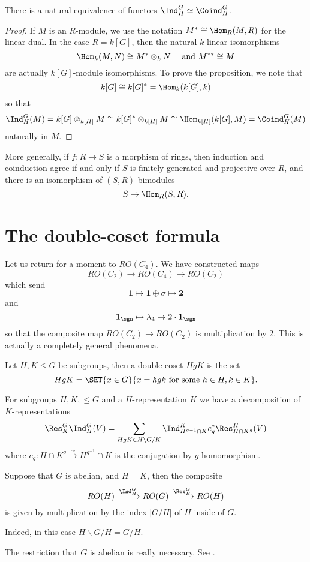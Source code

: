 \documentclass{willowtreebook}
\begin{document}
    \begin{proposition}
        There is a natural equivalence of functors $\Ind_H^G \simeq \Coind_H^G$. 
    \end{proposition}
    \begin{proof}
      If $M$ is an $R$-module, we use the notation $M^* \cong \Hom_R(M,R)$ for the linear dual. In the case $R = k[G]$, then the natural $k$-linear isomorphisms
      \[
      \Hom_k(M,N) \cong M^* \otimes_kN \quad \text{ and } M^{**} \cong M
      \]
      are actually $k[G]$-module isomorphisms. To prove the proposition, we note that
      \[
      k[G] \cong k[G]^* = \Hom_k(k[G],k)
      \]
      so that
      \[
      \Ind_H^G(M) = k[G] \otimes_{k[H]} M \cong k[G]^* \otimes_{k[H]}M \cong \Hom_{k[H]}(k[G],M) = \Coind_H^G(M)
      \]
      naturally in $M$. 
    \end{proof}
\begin{remark}
    More generally, if $f \colon R \to S$ is a morphism of rings, then induction and coinduction agree if and only if $S$ is finitely-generated and projective over $R$, and there is an isomorphism of $(S,R)$-bimodules
    \[
    S \to \Hom_R(S,R).
    \]
\end{remark}
\section{The double-coset formula}
Let us return for a moment to $RO(C_4)$. We have constructed maps
\[
RO(C_2) \to RO(C_4) \to RO(C_2)
\]
which send
\[
\mathbf{1} \mapsto \mathbf{1}\oplus \sigma \mapsto \mathbf{2}
\]
and
\[
\mathbf{1}_{\sgn} \mapsto \lambda_4 \mapsto 2 \cdot \mathbf{1}_{\sgn}
\]
so that the composite map $RO(C_2) \to RO(C_2)$ is multiplication by 2. This is actually a completely general phenomena. 
\begin{definition}
    Let $H,K \le G$ be subgroups, then a double coset $HgK$ is the set
    \[
    HgK = \SET{x \in G}{x = hgk \text{ for some } h \in H,k \in K}.
    \]
\end{definition}
\begin{theorem}
For subgroups $H,K,\le G$ and a $H$-representation $K$ we have a decomposition of $K$-representations
\[
\Res^G_K\Ind_H^G(V) = \sum_{HgK \in H \backslash G/K} \Ind_{H^{g-1} \cap K}^{K} c_g^*\Res^H_{H \cap K^g}(V)
\]
where $c_g \colon H \cap K^g \xrightarrow{\sim}H^{g^{-1}}\cap K$ is the conjugation by $g$ homomorphism. 
\end{theorem}
\begin{corollary}
    Suppose that $G$ is abelian, and $H = K$, then the composite 
    \[
    RO(H) \xrightarrow{\Ind_H^G} RO(G) \xrightarrow{\Res^G_H} RO(H)
    \]
    is given by multiplication by the index $|G/H|$ of $H$ inside of $G$. 
\end{corollary}
Indeed, in this case $H\backslash G/H = G/H$. 
\begin{remark}
    The restriction that $G$ is abelian is really necessary. See \cite[Example 1.1.51]{guillou}. 
\end{remark}
\end{document}
